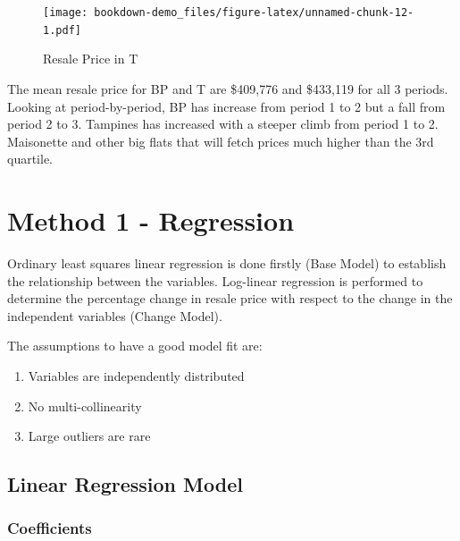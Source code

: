 \documentclass[]{book}
\begin{document}
\begin{figure}
\centering
\texttt{[image: bookdown-demo\_files/figure-latex/unnamed-chunk-12-1.pdf]}
\caption{\label{fig:unnamed-chunk-12}\label{fig:figs}Resale Price in T}
\end{figure}

The mean resale price for BP and T are \$409,776 and \$433,119 for all 3
periods. Looking at period-by-period, BP has increase from period 1 to 2
but a fall from period 2 to 3. Tampines has increased with a steeper
climb from period 1 to 2. Maisonette and other big flats that will fetch
prices much higher than the 3rd quartile.

\chapter{Method 1 - Regression}\label{method-1---regression}

Ordinary least squares linear regression is done firstly (Base Model) to
establish the relationship between the variables. Log-linear regression
is performed to determine the percentage change in resale price with
respect to the change in the independent variables (Change Model).

The assumptions to have a good model fit are:

\begin{enumerate}
\def\labelenumi{\arabic{enumi}.}
\item
  Variables are independently distributed
\item
  No multi-collinearity
\item
  Large outliers are rare
\end{enumerate}

\section{Linear Regression Model}\label{linear-regression-model}

\subsection{Coefficients}\label{coefficients}
\end{document}

